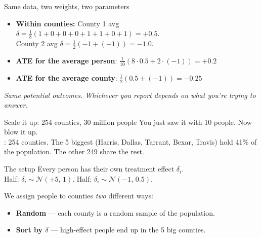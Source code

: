 \documentclass[aspectratio=169,11pt]{beamer}
\begin{document}
\begin{frame}{Same data, two weights, two parameters}
\vspace{0.6em}
\begin{itemize}
  \item \textbf{Within counties:} \quad County 1 avg $\delta = \tfrac{1}{8}(1{+}0{+}0{+}0{+}1{+}1{+}0{+}1) = \mathbf{+0.5}$. \\
  \hspace{4.6em} County 2 avg $\delta = \tfrac{1}{2}(-1{+}(-1)) = \mathbf{-1.0}$.
  \item \textbf{ATE for the average person}: $\tfrac{1}{10}(8\cdot 0.5 + 2\cdot(-1)) = \mathbf{+0.2}$
  \item \textbf{ATE for the average county}: $\tfrac{1}{2}(0.5 + (-1)) = \mathbf{-0.25}$
\end{itemize}
\vspace{0.8em}
\begin{center}
\small\color{warmgray}\itshape Same potential outcomes.  Whichever you report depends on what you're trying to answer.
\end{center}
\end{frame}

\begin{frame}{Scale it up: 254 counties, 30 million people}
You just saw it with 10 people. Now blow it up. \\
: 254 counties. The 5 biggest (Harris, Dallas, Tarrant, Bexar, Travis) hold 41\% of the population. The other 249 share the rest.
\vspace{0.5em}
\begin{block}{The setup}
\small
Every person has their own treatment effect $\delta_i$. \\[0.15em]
Half: $\delta_i \sim \mathcal{N}(+5,\,1)$. \;\; Half: $\delta_i \sim \mathcal{N}(-1,\,0.5)$. \;\; 
\end{block}
\vspace{0.3em}
We assign people to counties \textit{two} different ways:
\begin{itemize}\small
  \item[$\blacktriangleright$] \textbf{Random} --- each county is a random sample of the population.
  \item[$\blacktriangleright$] \textbf{Sort by $\delta$} --- high-effect people end up in the 5 big counties.
\end{itemize}
\end{frame}
\end{document}
